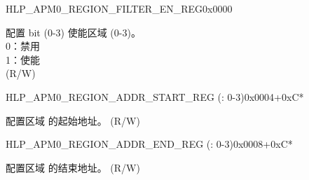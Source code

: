 \begin{register}{H}{LP\_APM0\_REGION\_FILTER\_EN\_REG}{0x0000}\label{regdesc:LPAPM0REGIONFILTERENREG}
%
%
\regnewline%
\begin{regdesc}\begin{reglist}
\label{fielddesc:LPAPM0REGIONFILTEREN}\item [LP\_APM0\_REGION\_FILTER\_EN] 配置 bit  (0-3) 使能区域  (0-3)。\\
0：禁用 \\
1：使能  \\ (R/W)
\end{reglist}\end{regdesc}
\end{register}


\begin{register}{H}{LP\_APM0\_REGION\_ADDR\_START\_REG (: 0-3)}{0x0004+0xC*}\label{regdesc:LPAPM0REGIONNADDRSTARTREG}
%
\regnewline%
\begin{regdesc}\begin{reglist}
\label{fielddesc:LPAPM0REGIONNADDRSTART}\item [LP\_APM0\_REGION\regindex{n}\_ADDR\_START] 配置区域  的起始地址。 (R/W)
\end{reglist}\end{regdesc}
\end{register}


\begin{register}{H}{LP\_APM0\_REGION\_ADDR\_END\_REG (: 0-3)}{0x0008+0xC*}\label{regdesc:LPAPM0REGIONNADDRENDREG}
%
\regnewline%
\begin{regdesc}\begin{reglist}
\label{fielddesc:LPAPM0REGIONNADDREND}\item [LP\_APM0\_REGION\regindex{n}\_ADDR\_END] 配置区域  的结束地址。 (R/W)
\end{reglist}\end{regdesc}
\end{register}



